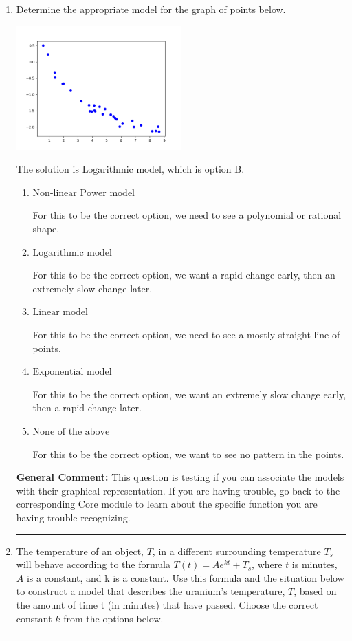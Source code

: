 \documentclass{extbook}[14pt]
\newcommand{\litem}[1]{\item #1

\rule{\textwidth}{0.4pt}}
\begin{document}
\begin{enumerate}\litem{
Determine the appropriate model for the graph of points below.

\begin{center}
    \includegraphics[width=0.5\textwidth]{../Figures/identifyModelGraph11CopyB.png}
\end{center}


The solution is \( \text{Logarithmic model} \), which is option B.\begin{enumerate}[label=\Alph*.]
\item \( \text{Non-linear Power model} \)

For this to be the correct option, we need to see a polynomial or rational shape.
\item \( \text{Logarithmic model} \)

For this to be the correct option, we want a rapid change early, then an extremely slow change later.
\item \( \text{Linear model} \)

For this to be the correct option, we need to see a mostly straight line of points.
\item \( \text{Exponential model} \)

For this to be the correct option, we want an extremely slow change early, then a rapid change later.
\item \( \text{None of the above} \)

For this to be the correct option, we want to see no pattern in the points.
\end{enumerate}

\textbf{General Comment:} This question is testing if you can associate the models with their graphical representation. If you are having trouble, go back to the corresponding Core module to learn about the specific function you are having trouble recognizing.
}
\litem{
The temperature of an object, $T$, in a different surrounding temperature $T_s$ will behave according to the formula $T(t) = Ae^{kt} + T_s$, where $t$ is minutes, $A$ is a constant, and k is a constant. Use this formula and the situation below to construct a model that describes the uranium's temperature, $T$, based on the amount of time t (in minutes) that have passed. Choose the correct constant $k$ from the options below.

}
\end{enumerate}
\end{document}
